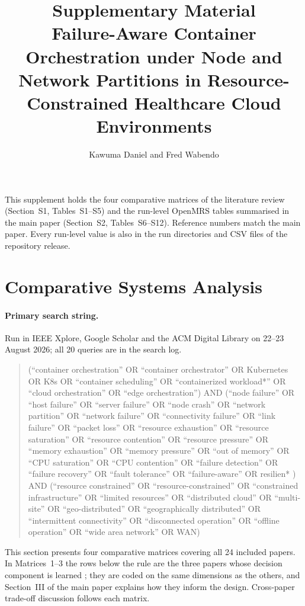 \documentclass[10pt]{article}
\title{Supplementary Material\\\large Failure-Aware Container Orchestration under Node and Network Partitions in Resource-Constrained Healthcare Cloud Environments}
\author{Kawuma Daniel and Fred Wabendo}
\date{}
\begin{document}
\maketitle
\noindent This supplement holds the four comparative matrices of the literature review (Section~S1, Tables~S1--S5) and the run-level OpenMRS tables summarised in the main paper (Section~S2, Tables~S6--S12). Reference numbers match the main paper. Every run-level value is also in the run directories and CSV files of the repository release.

\section{Comparative Systems Analysis}

\paragraph{Primary search string.} Run in IEEE Xplore, Google Scholar and the ACM Digital Library on 22--23 August 2026; all 20 queries are in the search log.
\begin{quote}
\footnotesize (``container orchestration'' OR ``container orchestrator'' OR Kubernetes OR K8s OR ``container scheduling'' OR ``containerized workload*'' OR ``cloud orchestration'' OR ``edge orchestration'') AND (``node failure'' OR ``host failure'' OR ``server failure'' OR ``node crash'' OR ``network partition'' OR ``network failure'' OR ``connectivity failure'' OR ``link failure'' OR ``packet loss'' OR ``resource exhaustion'' OR ``resource saturation'' OR ``resource contention'' OR ``resource pressure'' OR ``memory exhaustion'' OR ``memory pressure'' OR ``out of memory'' OR ``CPU saturation'' OR ``CPU contention'' OR ``failure detection'' OR ``failure recovery'' OR ``fault tolerance'' OR ``failure-aware'' OR resilien* ) AND (``resource constrained'' OR ``resource-constrained'' OR ``constrained infrastructure'' OR ``limited resources'' OR ``distributed cloud'' OR ``multi-site'' OR ``geo-distributed'' OR ``geographically distributed'' OR ``intermittent connectivity'' OR ``disconnected operation'' OR ``offline operation'' OR ``wide area network'' OR WAN)
\end{quote}
\label{sec:matrices}

This section presents four comparative matrices covering all 24 included papers. In Matrices~1--3 the rows below the rule are the three papers whose decision component is learned \cite{dsouza2026selfhealing, nigam2026chaos, mishra2026aidriven}; they are coded on the same dimensions as the others, and Section~III of the main paper explains how they inform the design. Cross-paper trade-off discussion follows each matrix.
\end{document}
